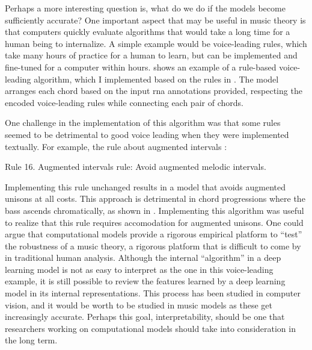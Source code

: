 

Perhaps a more interesting question is, what do we do if the
models become sufficiently accurate? One important aspect
that may be useful in music theory is that computers quickly
evaluate algorithms that would take a long time for a human
being to internalize. A simple example would be
voice-leading rules, which take many hours of practice for a
human to learn, but can be implemented and fine-tuned for a
computer within hours.  shows an
example of a rule-based voice-leading algorithm, which I
implemented based on the rules in
\textcite[p.~10]{huron2016voice}.
The model arranges each chord based on the input \gls{rna}
annotations provided, respecting the encoded voice-leading
rules while connecting each pair of chords. 


One challenge in the implementation of this algorithm was
that some rules seemed to be detrimental to good voice
leading when they were implemented textually. For example,
the rule about augmented intervals
\parencite[p.~12]{huron2016voice}:

\begin{italicsquote}
    Rule 16. Augmented intervals rule: Avoid augmented
    melodic intervals.
\end{italicsquote}

Implementing this rule unchanged results in a model that
avoids augmented unisons at all costs. This approach is
detrimental in chord progressions where the bass ascends
chromatically, as shown in
. Implementing this
algorithm was useful to realize that this rule requires
accomodation for augmented unisons. One could argue that
computational models provide a rigorous empirical platform
to ``test'' the robustness of a music theory, a rigorous
platform that is difficult to come by in traditional human
analysis. Although the internal ``algorithm'' in a deep
learning model is not as easy to interpret as the one in
this voice-leading example, it is still possible to review
the features learned by a deep learning model in its
internal representations. This process has been studied in
computer vision, and it would be worth to be studied in
music models as these get increasingly accurate. Perhaps
this goal, interpretability, should be one that researchers
working on computational models should take into
consideration in the long term.
